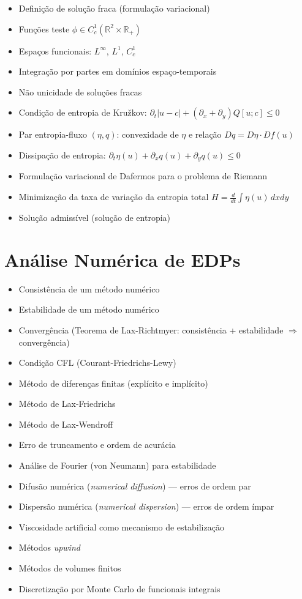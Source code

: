 \documentclass[12pt, a4paper]{article}
\begin{document}
\begin{itemize}
    \item Definição de solução fraca (formulação variacional)
    \item Funções teste $\phi \in C^1_c(\mathbb{R}^2 \times \mathbb{R}_+)$
    \item Espaços funcionais: $L^\infty$, $L^1$, $C^1_c$
    \item Integração por partes em domínios espaço-temporais
    \item Não unicidade de soluções fracas
    \item Condição de entropia de Kru\v{z}kov: $\partial_t |u - c| + (\partial_x + \partial_y) Q[u;c] \leq 0$
    \item Par entropia-fluxo $(η, q)$: convexidade de $\eta$ e relação $Dq = D\eta \cdot Df(u)$
    \item Dissipação de entropia: $\partial_t \eta(u) + \partial_x q(u) + \partial_y q(u) \leq 0$
    \item Formulação variacional de Dafermos para o problema de Riemann
    \item Minimização da taxa de variação da entropia total $H = \frac{d}{dt}\int \eta(u)\,dxdy$
    \item Solução admissível (solução de entropia)
\end{itemize}

\section*{Análise Numérica de EDPs}

\begin{itemize}
    \item Consistência de um método numérico
    \item Estabilidade de um método numérico
    \item Convergência (Teorema de Lax-Richtmyer: consistência + estabilidade $\Rightarrow$ convergência)
    \item Condição CFL (Courant-Friedrichs-Lewy)
    \item Método de diferenças finitas (explícito e implícito)
    \item Método de Lax-Friedrichs
    \item Método de Lax-Wendroff
    \item Erro de truncamento e ordem de acurácia
    \item Análise de Fourier (von Neumann) para estabilidade
    \item Difusão numérica (\textit{numerical diffusion}) --- erros de ordem par
    \item Dispersão numérica (\textit{numerical dispersion}) --- erros de ordem ímpar
    \item Viscosidade artificial como mecanismo de estabilização
    \item Métodos \textit{upwind}
    \item Métodos de volumes finitos
    \item Discretização por Monte Carlo de funcionais integrais
\end{itemize}
\end{document}
